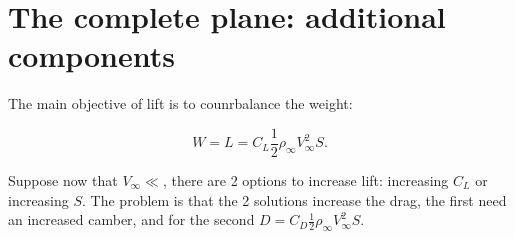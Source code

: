 
\chapter{The complete plane: additional components}
	The main objective of lift is to counrbalance the weight: 
	
	\begin{equation}
	W = L = C_L \frac{1}{2} \rho _\infty V_\infty ^2 S.
	\end{equation}
	
	Suppose now that $V_\infty \ll$, there are 2 options to increase lift: increasing $C_L$ or increasing $S$. The problem is that the 2 solutions increase the drag, the first need an increased camber, and for the second $D = C_D \frac{1}{2} \rho _\infty V_\infty ^2 S$.